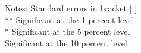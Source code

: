 \newline 
Notes: Standard errors in bracket [ ]\\
\quad *** Significant at the 1 percent level\\
\quad ** Significant at the 5 percent level\\
\quad * Significant at the 10 percent level